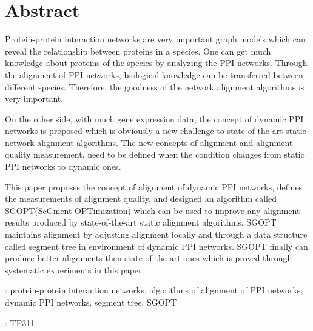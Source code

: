\chapter*{Abstract}

Protein-protein interaction networks are very important graph models which can reveal the relationship between proteins in a species. One can get much knowledge about proteins of the species by analyzing the PPI networks. Through the alignment of PPI networks, biological knowledge can be transferred between different species. Therefore, the goodness of the network alignment algorithms is very important.

On the other side, with much gene expression data, the concept of dynamic PPI networks is proposed which is obviously a new challenge to state-of-the-art static network alignment algorithms. The new concepts of alignment and alignment quality measurement, need to be defined when the condition changes from static PPI networks to dynamic ones.

This paper proposes the concept of alignment of dynamic PPI networks, defines the measurements of alignment quality, and designed an algorithm called SGOPT(SeGment OPTimization) which can be used to improve any alignment results produced by state-of-the-art static alignment algorithms. SGOPT maintains alignment by adjusting alignment locally and through a data structure called segment tree in environment of dynamic PPI networks. SGOPT finally can produce better alignments then state-of-the-art ones which is proved through systematic experiments in this paper.
\bigskip
\bigskip

: protein-protein interaction networks, algorithms of alignment of PPI networks, dynamic PPI networks, segment tree, SGOPT

: TP311